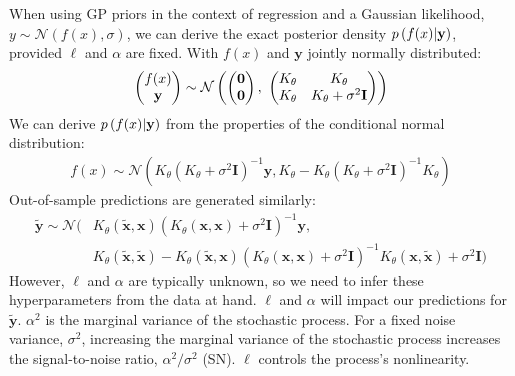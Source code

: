 \documentclass{article}
\newcommand{\lp}{\ensuremath{\left(}}
\newcommand{\rp}{\ensuremath{\right)}}
\begin{document}
When using GP priors in the context of regression and a Gaussian likelihood, $y \sim
\mathcal{N}(f(x), \sigma)$, we can derive the exact posterior density $p\lp f(x) |
\mathbf{y}\rp$, provided $\ell$ and $\alpha$ are fixed. With $f(x)$ and $\mathbf{y}$
jointly normally distributed:
\begin{align*} \begin{pmatrix} f(x)\\ \mathbf{y} \\ \end{pmatrix} \sim
\mathcal{N} \lp \begin{pmatrix} \mathbf{0} \\ \mathbf{0} \end{pmatrix} ,\,\,
  \begin{pmatrix} K_\theta &
  K_\theta  \\ K_\theta &
  K_\theta + \sigma ^ 2 \mathbf{I}\\ \end{pmatrix} \rp
\end{align*}
We can derive $p\lp f(x) | \mathbf{y}\rp$ from the properties of the conditional normal
distribution: 
\begin{align*}
  f(x) \sim
  \mathcal{N}(K_\theta  (K_\theta + \sigma ^ 2 \mathbf{I})^{-1}\mathbf{y},  
  K_\theta - K_\theta (K_\theta + \sigma ^ 2 \mathbf{I})^{-1}K_\theta)
\end{align*}
Out-of-sample predictions are generated similarly:
\begin{align*} 
  \mathbf{\tilde{y}} \sim
  \mathcal{N}(&K_\theta(\mathbf{\tilde{x}},\mathbf{x}) (K_\theta(\mathbf{x},\mathbf{x}) +
  \sigma ^ 2 \mathbf{I})^{-1}\mathbf{y},  
   \\ & K_\theta(\mathbf{\tilde{x}},\mathbf{\tilde{x}})
   -K_\theta(\mathbf{\tilde{x}},\mathbf{x}) (K_\theta(\mathbf{x},\mathbf{x}) +
   \sigma ^ 2 \mathbf{I})^{-1}K_\theta(\mathbf{x},\mathbf{\tilde{x}}) + \sigma
   ^ 2 \mathbf{I})
\end{align*}
However, $\ell$ and $\alpha$ are typically unknown, so we need to infer these
hyperparameters from the data at hand. $\ell$ and $\alpha$
will impact our predictions for $\tilde{\mathbf{y}}$. $\alpha^2$ is the
marginal variance of the stochastic process. For a fixed noise variance,
$\sigma^2$, increasing the marginal variance of the stochastic process
increases the signal-to-noise ratio, $\alpha^2 / \sigma^2$ (SN). $\ell$
controls the process's nonlinearity. 
\end{document}

